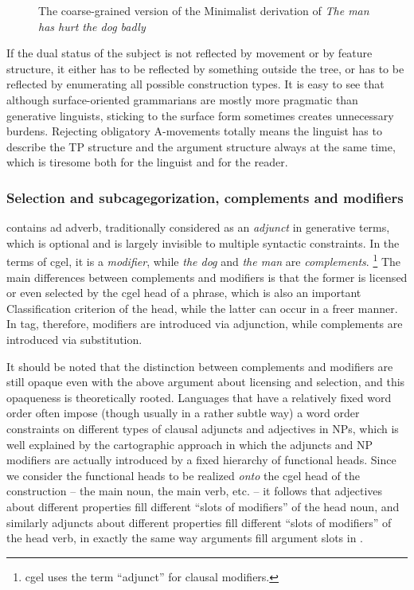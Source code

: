 \documentclass[../main.tex]{subfiles}
\begin{document}
\begin{figure}
    \centering
    
    \caption{The coarse-grained version of the Minimalist derivation of \emph{The man has hurt the dog badly}}
    \label{fig:coarse-grained-hurt-the-dog-badly}
\end{figure}

If the dual status of the subject is not reflected by movement or by feature structure, it either has to 
be reflected by something outside the tree, or has to be reflected by enumerating all possible construction types. 
It is easy to see that although surface-oriented grammarians are mostly more pragmatic than generative 
linguists, sticking to the surface form sometimes creates unnecessary burdens. Rejecting obligatory 
A-movements totally means the linguist has to describe the TP structure and the argument structure 
always at the same time, which is tiresome both for the linguist and for the reader. 

\subsubsection{Selection and subcagegorization, complements and modifiers}\label{sec:sub-cat}

 contains ad adverb, traditionally considered 
as an \emph{adjunct} in generative terms, which is optional and is largely invisible to multiple 
syntactic constraints. In the terms of \ac{cgel}, it is a \emph{modifier}, while \emph{the dog}
and \emph{the man} are \emph{complements}.%
\footnote{\ac{cgel} uses the term ``adjunct'' for clausal modifiers.}
The main differences between complements and modifiers is that the former is licensed or even selected 
by the \ac{cgel} head of a phrase, which is also an important Classification criterion of the head,
while the latter can occur in a freer manner. In \ac{tag}, therefore, modifiers are introduced 
via adjunction, while complements are introduced via substitution.

It should be noted that the distinction between complements and modifiers are still opaque even with 
the above argument about licensing and selection, and this opaqueness is theoretically rooted. 
Languages that have a relatively fixed word order often impose (though usually in a rather subtle way) 
a word order constraints on different types of clausal adjuncts and adjectives in NPs, 
which is well explained by the cartographic approach in which the adjuncts and NP modifiers 
are actually introduced by a fixed hierarchy of functional heads. Since we consider the functional heads 
to be realized \emph{onto} the \ac{cgel} head of the construction -- the main noun, the main verb, etc. -- 
it follows that adjectives about different properties fill different ``slots of modifiers'' of the head noun, 
and similarly adjuncts about different properties fill different ``slots of modifiers'' of the head verb, 
in exactly the same way arguments fill argument slots in . 
\end{document}
